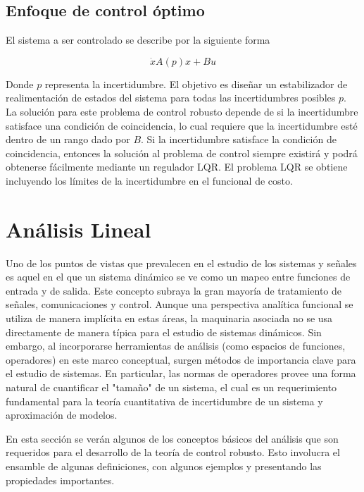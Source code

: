 \subsection{Enfoque de control óptimo}

El sistema a ser controlado se describe por la siguiente forma

\begin{equation*}
    \dot{x}A(p)x + B u
\end{equation*}

Donde $p$ representa la incertidumbre. El objetivo es diseñar un estabilizador de realimentación de estados del sistema para todas las incertidumbres posibles $p$. La solución para este problema de control robusto depende de si la incertidumbre satisface una condición de coincidencia, lo cual requiere que la incertidumbre esté dentro de un rango dado por $B$. Si la incertidumbre satisface la condición de coincidencia, entonces la solución al problema de control siempre existirá y podrá obtenerse fácilmente mediante un regulador LQR. El problema LQR se obtiene incluyendo los límites de la incertidumbre en el funcional de costo.

\section{Análisis Lineal}

Uno de los puntos de vistas que prevalecen en el estudio de los sistemas y señales es aquel en el que un sistema dinámico se ve como un mapeo entre funciones de entrada y de salida. Este concepto subraya la gran mayoría de tratamiento de señales, comunicaciones y control. Aunque una perspectiva analítica funcional se utiliza de manera implícita en estas áreas, la maquinaria asociada no se usa directamente de manera típica para el estudio de sistemas dinámicos. Sin embargo, al incorporarse herramientas de análisis (como espacios de funciones, operadores) en este marco conceptual, surgen métodos de importancia clave para el estudio de sistemas. En particular, las normas de operadores provee una forma natural de cuantificar el "tamaño" de un sistema, el cual es un requerimiento fundamental para la teoría cuantitativa de incertidumbre de un sistema y aproximación de modelos.

En esta sección se verán algunos de los conceptos básicos del análisis que son requeridos para el desarrollo de la teoría de control robusto. Esto involucra el ensamble de algunas definiciones, con algunos ejemplos y presentando las propiedades importantes. 

